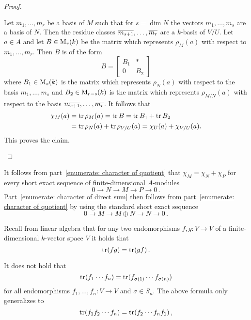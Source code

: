\begin{proof}
\begin{enumerate}
      Let $m_1, \dotsc, m_r$ be a basis of $M$ such that for $s = \dim N$ the vectors $m_1, \dotsc, m_s$ are a basis of $N$.
      Then the residue classes $\overline{m_{s+1}}, \dotsc, \overline{m_r}$ are a $k$-basis of $V/U$.
      Let $a \in A$ and let $B \in \operatorname{M}_r(k)$ be the matrix which represents $\rho_M(a)$ with respect to $m_1, \dotsc, m_r$.
      Then $B$ is of the form
      \[
          B
        = \begin{bmatrix}
            B_1 & * \\
            0 & B_2
          \end{bmatrix}
      \]
      where $B_1 \in \operatorname{M}_s(k)$ is the matrix which represents $\rho_N(a)$ with respect to the basis $m_1, \dotsc, m_s$ and $B_2 \in \operatorname{M}_{r-s}(k)$ is the matrix which represents $\rho_{M/N}(a)$ with respect to the basis $\overline{m_{s+1}}, \dotsc, \overline{m_r}$.
      It follows that
      \begin{align*}
            \chi_M(a)
        &=  \operatorname{tr} \rho_M(a)
         =  \operatorname{tr} B
         =  \operatorname{tr} B_1 + \operatorname{tr} B_2 \\
        &=  \operatorname{tr} \rho_N(a) + \operatorname{tr} \rho_{V/U}(a)
         =  \chi_U(a) + \chi_{V/U}(a).
      \end{align*}
      This proves the claim.
    \qedhere
  \end{enumerate}
\end{proof}


\begin{remark}
  It follows from part~\ref*{enumerate: character of quotient} that $\chi_M = \chi_N + \chi_P$ for every short exact sequence of finite-dimensional $A$-modules
  \[
        0
    \to N
    \to M
    \to P
    \to 0 \,.
  \]
  Part~\ref*{enumerate: character of direct sum} then follows from part~\ref*{enumerate: character of quotient} by using the standard short exact sequence
  \[
        0
    \to M
    \to M \oplus N
    \to N
    \to 0 \,.
  \]
\end{remark}


\begin{recall}
  Recall from linear algebra that for any two endomorphisms $f, g \colon V \to V$ of a finite-dimensional $k$-vector space $V$ it holds that
  \[
    \operatorname{tr}(fg) = \operatorname{tr}(gf) \,.
  \]
\end{recall}


\begin{warning}
  It does not hold that
  \[
      \operatorname{tr}(f_1 \dotsm f_n)
    = \operatorname{tr}(f_{\sigma(1)} \dotsm f_{\sigma(n)})
  \]
  for all endomorphisms $f_1, \dotsc, f_n \colon V \to V$ and $\sigma \in S_n$.
  The above formula only generalizes to
  \[
      \operatorname{tr}(f_1 f_2 \dotsm f_n)
    = \operatorname{tr}(f_2 \dotsm f_n f_1) \,,
  \]
\end{warning}


